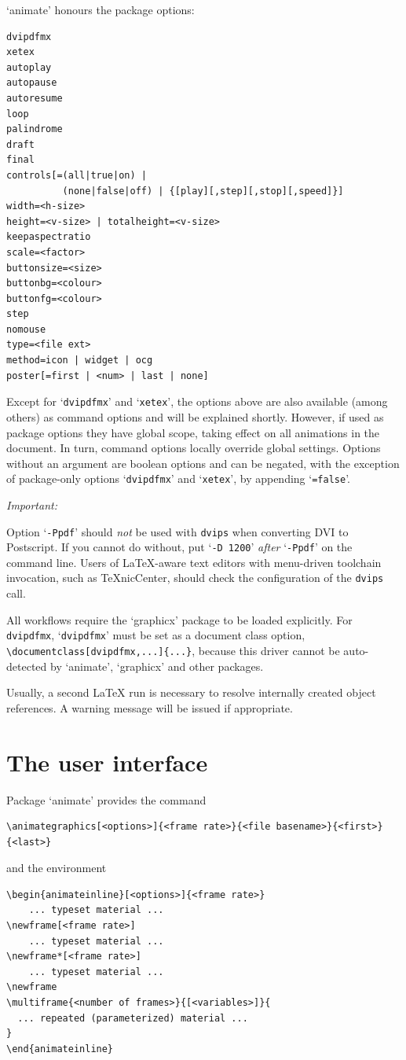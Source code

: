 \documentclass[a4paper]{article}
\begin{document}
`animate' honours the package options:
\begin{verbatim}
dvipdfmx
xetex
autoplay
autopause
autoresume
loop
palindrome
draft
final
controls[=(all|true|on) |
          (none|false|off) | {[play][,step][,stop][,speed]}]
width=<h-size>
height=<v-size> | totalheight=<v-size>
keepaspectratio
scale=<factor>
buttonsize=<size>
buttonbg=<colour>
buttonfg=<colour>
step
nomouse
type=<file ext>
method=icon | widget | ocg
poster[=first | <num> | last | none]
\end{verbatim}
Except for `\verb+dvipdfmx+' and `\verb+xetex+', the options above are also available (among others) as command options and will be explained shortly. However, if used as package options they have global scope, taking effect on all animations in the document. In turn, command options locally override global settings. Options without an argument are boolean options and can be negated, with the exception of package-only options `\verb+dvipdfmx+' and `\verb+xetex+', by appending `\verb+=false+'.

\begin{animateinline}{1}\strut\emph{Important:}\newframe[3]\end{animateinline} Option `\verb+-Ppdf+' should \emph{not} be used with \verb+dvips+ when converting DVI to Postscript. If you cannot do without, put `\verb+-D 1200+' \emph{after} `\verb+-Ppdf+' on the command line. Users of \LaTeX-aware text editors with menu-driven toolchain invocation, such as \TeX{}nicCenter, should check the configuration of the \verb+dvips+ call.

All workflows require the `graphicx' package to be loaded explicitly. For \verb+dvipdfmx+, `\verb+dvipdfmx+' must be set as a document class option, \verb+\documentclass[dvipdfmx,...]{...}+, because this driver cannot be auto-detected by `animate', `graphicx' and other packages.

Usually, a second \LaTeX{} run is necessary to resolve internally created object references. A warning message will be issued if appropriate.

\section{The user interface}
Package `animate' provides the command
\begin{verbatim}
\animategraphics[<options>]{<frame rate>}{<file basename>}{<first>}{<last>}
\end{verbatim}
and the environment
\begin{verbatim}
\begin{animateinline}[<options>]{<frame rate>}
    ... typeset material ...
\newframe[<frame rate>]
    ... typeset material ...
\newframe*[<frame rate>]
    ... typeset material ...
\newframe
\multiframe{<number of frames>}{[<variables>]}{
  ... repeated (parameterized) material ...
}
\end{animateinline}
\end{verbatim}
\end{document}
